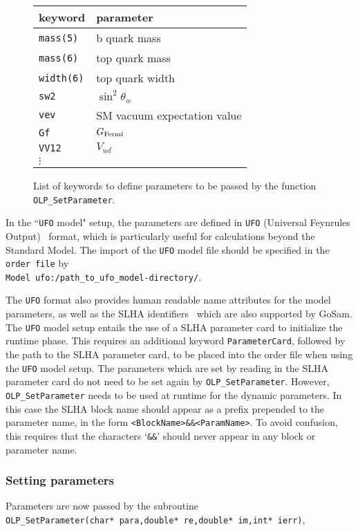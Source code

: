 \begin{figure}[htb]
\begin{tabular}{|l|l|}
\hline
keyword & parameter\\
\hline
{\tt mass(5)} & b quark mass \\
{\tt mass(6)} & top quark mass \\
{\tt width(6)} & top quark width\\
{\tt sw2}& $\sin^2\theta_w$\\
{\tt vev}& SM vacuum expectation value\\
{\tt Gf} & $G_{\rm{Fermi}}$\\
{\tt VV12}& $V_{ud}$\\
$\vdots$ & \\
\hline
\end{tabular}
\caption{List of keywords to define parameters to be passed by the function {\tt
OLP\_SetParameter}.}
\label{tab:keywords:static}
\end{figure}

In the ``{\tt UFO} model" setup, the parameters are defined in {\tt UFO} (Universal Feynrules
Output)~\cite{Degrande:2011ua} format, which is particularly useful for
calculations beyond the Standard Model.
The import of the {\tt UFO} model file should be specified in the {\tt order file} 
by \\{\tt Model ufo:/path\_to\_ufo\_model-directory/}.

The {\tt UFO}  format also provides human readable name attributes for the 
model parameters, as well as the 
SLHA identifiers~\cite{Skands:2003cj} which are also supported by GoSam.
The {\tt UFO} model setup entails the use of a SLHA parameter card to initialize the runtime phase.
This requires an additional keyword {\tt ParameterCard}, followed by the path to the SLHA parameter card,
to be placed into the order file when using the {\tt UFO} model setup. 
The parameters which are set by reading in the SLHA parameter card do not need to be set 
again by {\tt OLP\_SetParameter}. However, {\tt OLP\_SetParameter} needs to be used at 
runtime for the dynamic parameters. 
In this case the SLHA block name should appear as a prefix prepended to the parameter name, 
in the form  
{\tt <BlockName>\&\&<ParamName>}.
To avoid confusion, this requires that the characters `{\tt \&\&}' should never appear in 
any block or parameter name.

\subsubsection{Setting parameters}
Parameters are now passed by the subroutine \\
{\tt OLP\_SetParameter(char*~para,double*~re,double*~im,int* ierr)},\\

